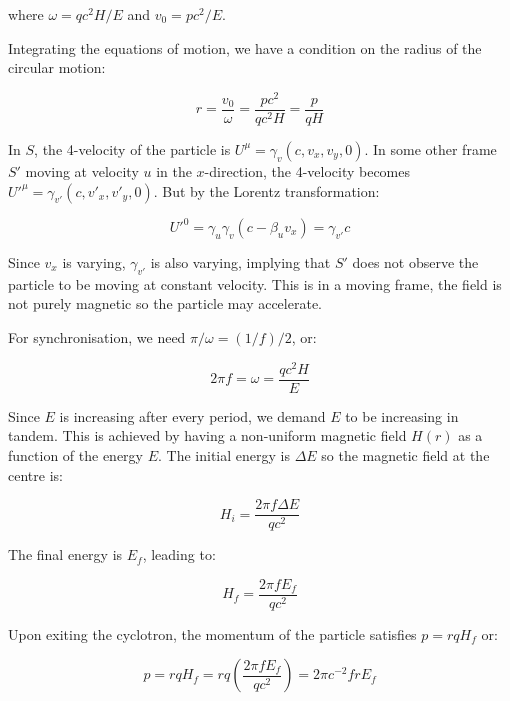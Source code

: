 \documentclass[12pt]{article}
\begin{document}
where $\omega = qc^{2}H/E$ and $v_{0} = pc^{2}/E$.

Integrating the equations of motion, we have a condition on the radius of the circular motion:

\begin{equation}
    r = \frac{v_{0}}{\omega} = \frac{pc^{2}}{qc^{2}H} = \frac{p}{qH}
\end{equation}

In $S$, the 4-velocity of the particle is $U^{\mu} = \gamma_{v} (c, v_{x}, v_{y}, 0)$. In some other frame $S'$ moving at velocity $u$ in the $x$-direction, the 4-velocity becomes $U'^{\mu} = \gamma_{v'} (c, v'_{x}, v'_{y}, 0)$. But by the Lorentz transformation:

\begin{equation}
    U'^{0} = \gamma_{u} \gamma_{v} (c - \beta_{u} v_{x}) = \gamma_{v'} c
\end{equation}

Since $v_{x}$ is varying, $\gamma_{v'}$ is also varying, implying that $S'$ does not observe the particle to be moving at constant velocity. This is in a moving frame, the field is not purely magnetic so the particle may accelerate.

For synchronisation, we need $\pi/\omega = (1/f)/2$, or:

\begin{equation}
    2\pi f = \omega = \frac{qc^{2}H}{E}
\end{equation}

Since $E$ is increasing after every period, we demand $E$ to be increasing in tandem. This is achieved by having a non-uniform magnetic field $H(r)$ as a function of the energy $E$. The initial energy is $\Delta E$ so the magnetic field at the centre is:

\begin{equation}
    H_{i} = \frac{2\pi f \Delta E}{qc^{2}}
\end{equation}

The final energy is $E_{f}$, leading to:

\begin{equation}
    H_{f} = \frac{2\pi f E_{f}}{qc^{2}}
\end{equation}

Upon exiting the cyclotron, the momentum of the particle satisfies $p = rqH_{f}$ or:

\begin{equation}
    p = rqH_{f} = rq \left( \frac{2\pi f E_{f}}{qc^{2}} \right) = 2\pi c^{-2} f r E_{f}
\end{equation}
\end{document}
